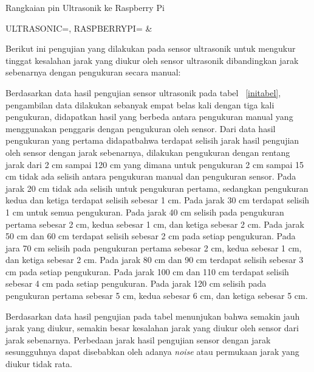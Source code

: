 \begin{atable}
    \caption{Rangkaian pin Ultrasonik ke Raspberry Pi}
    \label{table:tableUltrasonic}
        {
            ULTRASONIC=\ULTRASONIC, 
            RASPBERRYPI=\RASPBERRYPI}
        {
            \ULTRASONIC & 
            \RASPBERRYPI}
\end{atable}

Berikut ini pengujian yang dilakukan pada sensor ultrasonik untuk mengukur tinggat kesalahan jarak yang diukur oleh sensor ultrasonik dibandingkan jarak sebenarnya dengan pengukuran secara manual:


Berdasarkan data hasil pengujian sensor ultrasonik pada tabel ~\ref{initabel}, pengambilan data dilakukan sebanyak empat belas kali dengan tiga kali pengukuran, didapatkan hasil yang berbeda antara pengukuran manual yang menggunakan penggaris dengan pengukuran oleh sensor. Dari data hasil pengukuran yang pertama didapatbahwa terdapat selisih jarak hasil pengujian oleh sensor dengan jarak sebenarnya, dilakukan pengukuran dengan rentang jarak dari 2 cm sampai 120 cm yang dimana untuk pengukuran 2 cm sampai 15 cm tidak ada selisih antara pengukuran manual dan pengukuran sensor. Pada jarak 20 cm tidak ada selisih untuk pengukuran pertama, sedangkan pengukuran kedua dan ketiga terdapat selisih sebesar 1 cm. Pada jarak 30 cm terdapat selisih 1 cm untuk semua pengukuran. Pada jarak 40 cm selisih pada pengukuran pertama sebesar 2 cm, kedua sebesar 1 cm, dan ketiga sebesar 2 cm. Pada jarak 50 cm dan 60 cm terdapat selisih sebesar 2 cm pada setiap pengukuran. Pada jara 70 cm selisih pada pengukuran pertama sebesar 2 cm, kedua sebesar 1 cm, dan ketiga sebesar 2 cm. Pada jarak 80 cm dan 90 cm terdapat selisih sebesar 3 cm pada setiap pengukuran. Pada jarak 100 cm dan 110 cm terdapat selisih sebesar 4 cm pada setiap pengukuran. Pada jarak 120 cm selisih pada pengukuran pertama sebesar 5 cm, kedua sebesar 6 cm, dan ketiga sebesar 5 cm.

Berdasarkan data hasil pengujian pada tabel menunjukan bahwa semakin jauh jarak yang diukur, semakin besar kesalahan jarak yang diukur oleh sensor dari jarak sebenarnya. Perbedaan jarak hasil pengujian sensor dengan jarak sesungguhnya dapat disebabkan oleh adanya \textit{noise} atau permukaan jarak yang diukur tidak rata.

